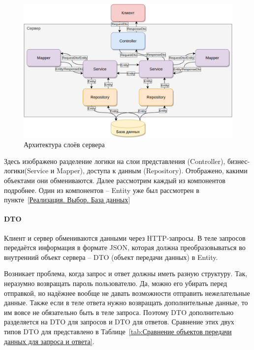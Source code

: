 \documentclass[a4paper,article]{article}
\begin{document}
    \begin{figure}[h]
        
        \centering
        
        \includegraphics[width=0.9\linewidth]{Схема работы сервера.png}
        
        \caption{\centering Архитектура слоёв сервера}
        
        \label{fig:Схема работы сервера}
        
    \end{figure}
    
    Здесь изображено разделение логики на слои представления (Controller), бизнес-логики(Service и Mapper), доступа к данным (Repository). Отображено, какими объектами они обмениваются. Далее рассмотрим каждый из компонентов подробнее. Один из компонентов -- Entity уже был рассмотрен в пункте~\ref{Реализация. Выбор. База данных}
    
    \paragraph{DTO}\label{Реализация. Сервер. DTO}
    
    Клиент и сервер обмениваются данными через HTTP-запросы. В теле запросов передаётся информация в формате JSON, которая должна преобразовываться во внутренний объект сервера -- DTO (объект передачи данных) в Entity. 
    
    Возникает проблема, когда запрос и ответ должны иметь разную структуру. Так, неразумно возвращать пароль пользователю. Да, можно его убирать перед отправкой, но надёжнее вообще не давать возможности отправить нежелательные данные. Также если в теле ответа нужно возвращать дополнительные данные, то им вовсе не обязательно быть в теле запроса. Поэтому DTO дополнительно разделяется на DTO для запросов и DTO для ответов. Сравнение этих двух типов DTO для  представлено в Таблице~\ref{tab:Сравнение объектов передачи данных для запроса и ответа}.
    
\end{document}
